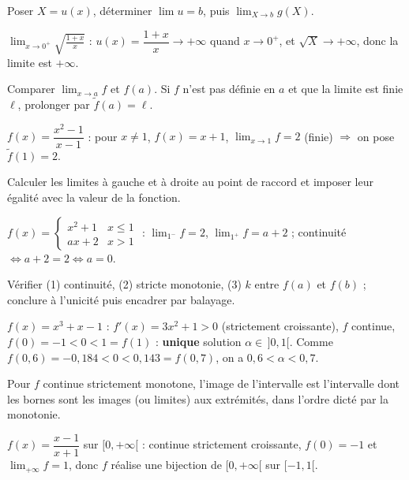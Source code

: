 Poser $X=u(x)$, déterminer $\lim u=b$, puis $\lim_{X\to b}g(X)$.
\begin{exemple}
$\displaystyle\lim_{x\to0^{+}}\sqrt{\frac{1+x}{x}}$ : $u(x)=\dfrac{1+x}{x}\to+\infty$ quand $x\to0^{+}$, et $\sqrt X\to+\infty$, donc la limite est $+\infty$.
\end{exemple}

Comparer $\displaystyle\lim_{x\to a}f$ et $f(a)$. Si $f$ n'est pas définie en $a$ et que la limite est finie $\ell$, prolonger par $\tilde f(a)=\ell$.
\begin{exemple}
$f(x)=\dfrac{x^{2}-1}{x-1}$ : pour $x\neq1$, $f(x)=x+1$, $\displaystyle\lim_{x\to1}f=2$ (finie) $\Rightarrow$ on pose $\tilde f(1)=2$.
\end{exemple}

Calculer les limites à gauche et à droite au point de raccord et imposer leur égalité avec la valeur de la fonction.
\begin{exemple}
$f(x)=\begin{cases}x^{2}+1 & x\le1\\ ax+2 & x>1\end{cases}$ : $\displaystyle\lim_{1^{-}}f=2$, $\displaystyle\lim_{1^{+}}f=a+2$ ; continuité $\Leftrightarrow a+2=2\Leftrightarrow a=0$.
\end{exemple}

Vérifier (1) continuité, (2) stricte monotonie, (3) $k$ entre $f(a)$ et $f(b)$ ; conclure à l'unicité puis encadrer par balayage.
\begin{exemple}
$f(x)=x^{3}+x-1$ : $f'(x)=3x^{2}+1>0$ (strictement croissante), $f$ continue, $f(0)=-1<0<1=f(1)$ : \textbf{unique} solution $\alpha\in\,]0,1[$. Comme $f(0{,}6)=-0{,}184<0<0{,}143=f(0{,}7)$, on a $0{,}6<\alpha<0{,}7$.
\end{exemple}

Pour $f$ continue strictement monotone, l'image de l'intervalle est l'intervalle dont les bornes sont les images (ou limites) aux extrémités, dans l'ordre dicté par la monotonie.
\begin{exemple}
$f(x)=\dfrac{x-1}{x+1}$ sur $[0,+\infty[$ : continue strictement croissante, $f(0)=-1$ et $\displaystyle\lim_{+\infty}f=1$, donc $f$ réalise une bijection de $[0,+\infty[$ sur $[-1,1[$.
\end{exemple}

